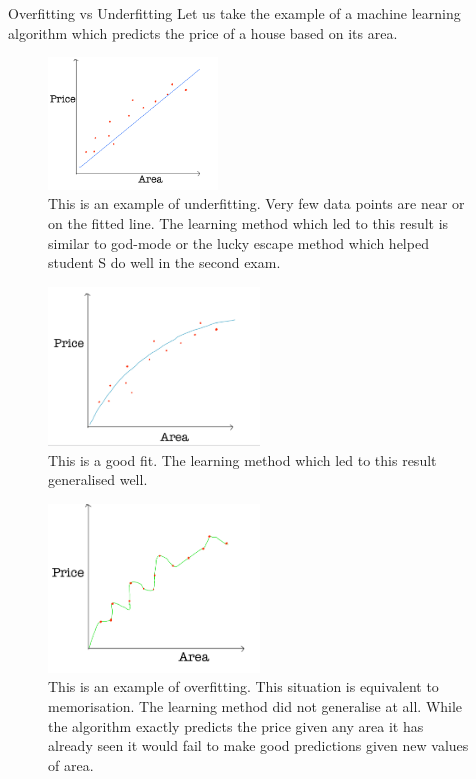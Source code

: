 \documentclass[11pt,notheorems,hyperref={pdfauthor=whatever}]{beamer}
\begin{document}
\begin{frame}[allowframebreaks]{Overfitting vs Underfitting}
Let us take the example of a machine learning algorithm which predicts the price of a house based on its area.
    \begin{figure}
    \centering
    \includegraphics[width=0.4\textwidth]{figures/fitting_1.png}
    \caption{This is an example of underfitting. Very few data points are near or on the fitted line. The learning method which led to this result is similar to god-mode or the lucky escape method which helped student S do well in the second exam.}
    \label{fig:underfit}
    \end{figure}

    \begin{figure}
    \centering
    \includegraphics[width=0.5\textwidth]{figures/fitting_2.png}
    \caption{This is a good fit. The learning method which led to this result generalised well.}
    \end{figure}
    
    \begin{figure}
    \centering
    \includegraphics[width=0.5\textwidth]{figures/fitting_3.png}
    \caption{This is an example of overfitting. This situation is equivalent to memorisation. The learning method did not generalise at all. While the algorithm exactly predicts the price given any area it has already seen it would fail to make good predictions given new values of area.}
    \label{fig:overfit}
    \end{figure}
     
\end{frame}
\end{document}
